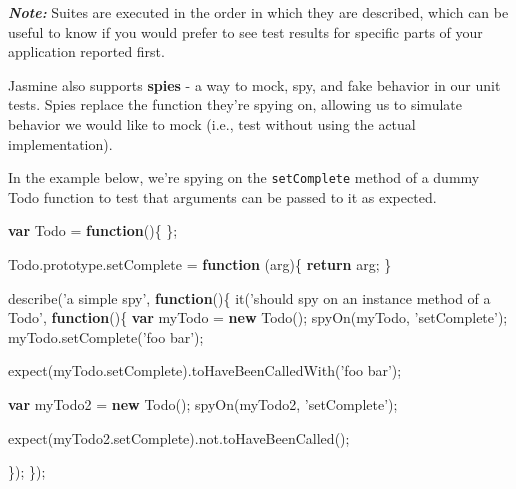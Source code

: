 \documentclass[9pt]{book}
\newenvironment{Shaded}{}{}
\newcommand{\KeywordTok}[1]{\textcolor[rgb]{0.00,0.44,0.13}{\textbf{{#1}}}}
\newcommand{\StringTok}[1]{\textcolor[rgb]{0.25,0.44,0.63}{{#1}}}
\newcommand{\OtherTok}[1]{\textcolor[rgb]{0.00,0.44,0.13}{{#1}}}
\newcommand{\FunctionTok}[1]{\textcolor[rgb]{0.02,0.16,0.49}{{#1}}}
\newcommand{\NormalTok}[1]{{#1}}
\begin{document}
\textbf{\emph{Note:}} Suites are executed in the order in which they are
described, which can be useful to know if you would prefer to see test
results for specific parts of your application reported first.

Jasmine also supports \textbf{spies} - a way to mock, spy, and fake
behavior in our unit tests. Spies replace the function they're spying
on, allowing us to simulate behavior we would like to mock (i.e., test
without using the actual implementation).

In the example below, we're spying on the \texttt{setComplete} method of
a dummy Todo function to test that arguments can be passed to it as
expected.

\begin{Shaded}
\begin{Highlighting}[]
\KeywordTok{var} \NormalTok{Todo = }\KeywordTok{function}\NormalTok{()\{}
\NormalTok{\};}

\OtherTok{Todo}\NormalTok{.}\OtherTok{prototype}\NormalTok{.}\FunctionTok{setComplete} \NormalTok{= }\KeywordTok{function} \NormalTok{(arg)\{}
    \KeywordTok{return} \NormalTok{arg;}
\NormalTok{\}}

\FunctionTok{describe}\NormalTok{(}\StringTok{'a simple spy'}\NormalTok{, }\KeywordTok{function}\NormalTok{()\{}
    \FunctionTok{it}\NormalTok{(}\StringTok{'should spy on an instance method of a Todo'}\NormalTok{, }\KeywordTok{function}\NormalTok{()\{}
        \KeywordTok{var} \NormalTok{myTodo = }\KeywordTok{new} \FunctionTok{Todo}\NormalTok{();}
        \FunctionTok{spyOn}\NormalTok{(myTodo, }\StringTok{'setComplete'}\NormalTok{);}
        \OtherTok{myTodo}\NormalTok{.}\FunctionTok{setComplete}\NormalTok{(}\StringTok{'foo bar'}\NormalTok{);}

        \FunctionTok{expect}\NormalTok{(}\OtherTok{myTodo}\NormalTok{.}\FunctionTok{setComplete}\NormalTok{).}\FunctionTok{toHaveBeenCalledWith}\NormalTok{(}\StringTok{'foo bar'}\NormalTok{);}

        \KeywordTok{var} \NormalTok{myTodo2 = }\KeywordTok{new} \FunctionTok{Todo}\NormalTok{();}
        \FunctionTok{spyOn}\NormalTok{(myTodo2, }\StringTok{'setComplete'}\NormalTok{);}

        \FunctionTok{expect}\NormalTok{(}\OtherTok{myTodo2}\NormalTok{.}\FunctionTok{setComplete}\NormalTok{).}\OtherTok{not}\NormalTok{.}\FunctionTok{toHaveBeenCalled}\NormalTok{();}

    \NormalTok{\});}
\NormalTok{\});}
\end{Highlighting}
\end{Shaded}
\end{document}
